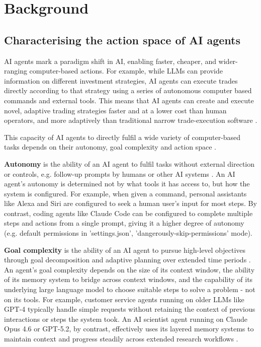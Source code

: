 \documentclass[manuscript,screen,nonacm,oneside]{acmart}
\begin{document}
\section{Background}
\label{sec:background}
\subsection{Characterising the action space of AI agents}
AI agents mark a paradigm shift in AI, enabling faster, cheaper, and wider-ranging computer-based actions. For example, while LLMs can provide information on different investment strategies, AI agents can execute trades directly according to that strategy using a series of autonomous computer based commands and external tools. This means that AI agents can create and execute novel, adaptive trading strategies faster and at a lower cost than human operators, and more adaptively than traditional narrow trade-execution software \citep{li2025hedgeagents}. 

This capacity of AI agents to directly fulfil a wide variety of computer-based tasks depends on their autonomy, goal complexity and action space \citep{kasirzadeh2025characterizing, chan2023harms, imda}. 

\textbf{Autonomy} is the ability of an AI agent to fulfil tasks without external direction or controls, e.g. follow-up prompts by humans or other AI systems \citep{cihon2025measuring}. An AI agent's autonomy is determined not by what tools it has access to, but how the system is configured. For example, when given a command, personal assistants like Alexa and Siri are configured to seek a human user's input for most steps. By contrast, coding agents like Claude Code can be configured to complete multiple steps and actions from a single prompt, giving it a higher degree of autonomy (e.g. default permissions in 'settings.json', 'dangerously-skip-permissions' mode).

\textbf{Goal complexity} is the ability of an AI agent to pursue high-level objectives through goal decomposition and adaptive planning over extended time periods \citep{chan2023harms, kasirzadeh2025characterizing}. An agent's goal complexity depends on the size of its context window, the ability of its memory system to bridge across context windows, and the capability of its underlying large language model to choose suitable steps to solve a problem - not on its tools. For example, customer service agents running on older LLMs like GPT-4 typically handle simple requests without retaining the context of previous interactions or steps the system took. An AI scientist agent running on Claude Opus 4.6 or GPT-5.2, by contrast, effectively uses its layered memory systems to maintain context and progress steadily across extended research workflows \citep{lu2024aiscientist}.
\end{document}
